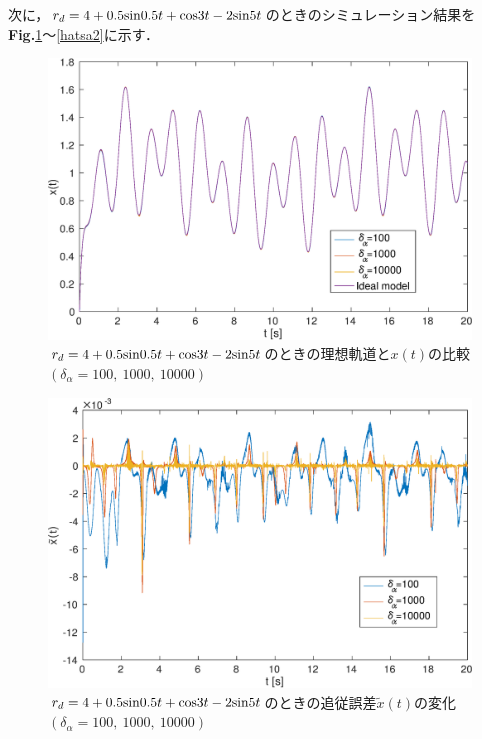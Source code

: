 \documentclass[a4paper,12pt]{jarticle}
\begin{document}
次に，$ r_d = 4 + 0.5{\rm sin}0.5t + {\rm cos}3t -2{\rm sin}5t $のときのシミュレーション結果を{\bf Fig.}{\ref{xa2}}〜{\ref{hatsa2}}に示す．
\begin{figure}[H]
 \begin{center}
  \includegraphics[scale=0.485]{../figure/eps/estimate/2/x.eps}
  \caption{$ r_d = 4 + 0.5{\rm sin}0.5t + {\rm cos}3t -2{\rm sin}5t $のときの理想軌道と$ x(t) $の比較$(\delta_{\alpha} = 100, ~ 1000, ~ 10000 )$}
  \label{xa2}
 \end{center}
\end{figure}
\begin{figure}[H]
 \begin{center}
  \includegraphics[scale=0.5]{../figure/eps/estimate/2/tilde_x.eps}
  \caption{$ r_d = 4 + 0.5{\rm sin}0.5t + {\rm cos}3t -2{\rm sin}5t $のときの追従誤差$ \tilde{x}(t) $の変化$(\delta_{\alpha} = 100, ~ 1000, ~ 10000 )$}
  \label{tilde_xa2}
 \end{center}
\end{figure}
\end{document}
